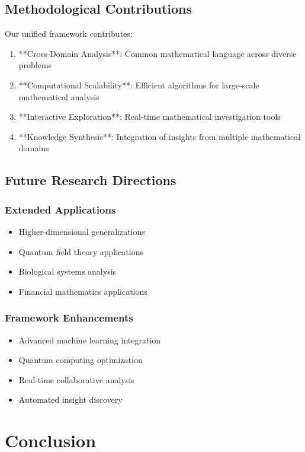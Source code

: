 \documentclass[12pt]{article}
\begin{document}
\subsection{Methodological Contributions}

Our unified framework contributes:
\begin{enumerate}
    \item **Cross-Domain Analysis**: Common mathematical language across diverse problems
    \item **Computational Scalability**: Efficient algorithms for large-scale mathematical analysis
    \item **Interactive Exploration**: Real-time mathematical investigation tools
    \item **Knowledge Synthesis**: Integration of insights from multiple mathematical domains
\end{enumerate}

\subsection{Future Research Directions}

\subsubsection{Extended Applications}
\begin{itemize}
    \item Higher-dimensional generalizations
    \item Quantum field theory applications
    \item Biological systems analysis
    \item Financial mathematics applications
\end{itemize}

\subsubsection{Framework Enhancements}
\begin{itemize}
    \item Advanced machine learning integration
    \item Quantum computing optimization
    \item Real-time collaborative analysis
    \item Automated insight discovery
\end{itemize}

\section{Conclusion}
\end{document}
